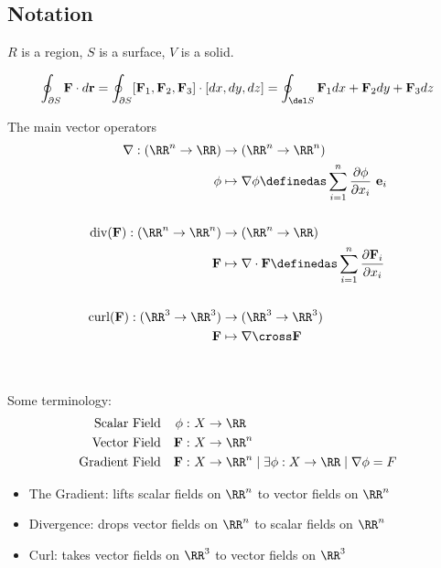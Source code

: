 \hypertarget{notation-1}{%
\subsection{Notation}\label{notation-1}}

\(R\) is a region, \(S\) is a surface, \(V\) is a solid.

\begin{align*}  
\oint _ { \partial S } \mathbf { F } \cdot d \mathbf { r } =    
\oint _ { \partial S } [\mathbf{F}_1, \mathbf{F}_2, \mathbf{F}_3] \cdot [dx, dy, dz] 
= \oint_{\del S} \mathbf{F}_1dx + \mathbf{F}_2dy + \mathbf{F}_3dz
\end{align*}

The main vector operators
\begin{align*}
\nabla: (\RR^n \to \RR) &\to (\RR^n \to \RR^n) \\
\phi &\mapsto \nabla \phi \definedas \sum_{i=1}^n \frac{\partial \phi}{\partial x_i} ~\mathbf{e}_i \\ \\
\text{}
\mathrm{div}(\mathbf{F}): (\RR^n \to \RR^n) &\to (\RR^n \to \RR) \\
\mathbf{F} &\mapsto \nabla \cdot \mathbf{F}
\definedas \sum_{i=1}^n \frac{\partial \mathbf{F}_i}{\partial x_i} \\ \\
\text{}
\mathrm{curl}(\mathbf{F}): (\RR^3 \to \RR^3) &\to (\RR^3 \to \RR^3) \\
\mathbf{F} &\mapsto \nabla \cross \mathbf{F} \\ \\
\text{}
\end{align*} Some terminology:
\begin{align*}
\text{Scalar Field} && \phi:&~ X \to \RR \\
\text{Vector Field} && \mathbf{F}:&~ X\to \RR^n\\
\text{Gradient Field} && \mathbf{F}:&~ X \to \RR^n \mid \exists \phi: X\to \RR \mid \nabla \phi = F
\end{align*}

\begin{itemize}
\tightlist
\item
  The Gradient: lifts scalar fields on \(\RR^n\) to vector fields on
  \(\RR^n\)
\item
  Divergence: drops vector fields on \(\RR^n\) to scalar fields on
  \(\RR^n\)
\item
  Curl: takes vector fields on \(\RR^3\) to vector fields on \(\RR^3\)
\end{itemize}

